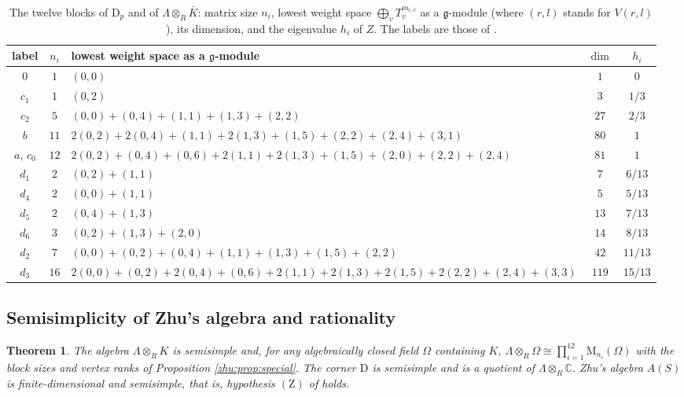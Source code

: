 \documentclass[leqno]{article}
\newcommand{\Cbb}{\ensuremath{\mathbb{C}}}
\newcommand{\D}{\mathrm{D}}
\newcommand{\M}{\mathrm{M}}
\newcommand{\ot}{\otimes}
\newcommand{\ovl}{\overline}
\newtheorem{thm}{Theorem}[section]
\numberwithin{equation}{section}
\begin{document}
\begin{table}[ht]
\centering
\footnotesize
\begin{tabular}{|c|c|p{8.2cm}|c|c|}
\hline
label & $n_i$ & lowest weight space as a $\mathfrak g$-module & $\dim$ & $h_i$\\
\hline
$0$ & $1$ & $(0,0)$ & $1$ & $0$\\
$c_1$ & $1$ & $(0,2)$ & $3$ & $1/3$\\
$c_2$ & $5$ & $(0,0)+(0,4)+(1,1)+(1,3)+(2,2)$ & $27$ & $2/3$\\
$b$ & $11$ & $2(0,2)+2(0,4)+(1,1)+2(1,3)+(1,5)+(2,2)+(2,4)+(3,1)$ & $80$ & $1$\\
$a$, $c_0$ & $12$ & $2(0,2)+(0,4)+(0,6)+2(1,1)+2(1,3)+(1,5)+(2,0)+(2,2)+(2,4)$ & $81$ & $1$\\
$d_1$ & $2$ & $(0,2)+(1,1)$ & $7$ & $6/13$\\
$d_4$ & $2$ & $(0,0)+(1,1)$ & $5$ & $5/13$\\
$d_5$ & $2$ & $(0,4)+(1,3)$ & $13$ & $7/13$\\
$d_6$ & $3$ & $(0,2)+(1,3)+(2,0)$ & $14$ & $8/13$\\
$d_2$ & $7$ & $(0,0)+(0,2)+(0,4)+(1,1)+(1,3)+(1,5)+(2,2)$ & $42$ & $11/13$\\
$d_3$ & $16$ & $2(0,0)+(0,2)+2(0,4)+(0,6)+2(1,1)+2(1,3)+2(1,5)+2(2,2)+(2,4)+(3,3)$ & $119$ & $15/13$\\
\hline
\end{tabular}
\caption{The twelve blocks of $\D_p$ and of $\Lambda \ot_R \ovl K$: matrix size $n_i$, lowest weight space $\bigoplus_v T_v^{m_{i,v}}$ as a $\mathfrak g$-module (where $(r,l)$ stands for $V(r,l)$), its dimension, and the eigenvalue $h_i$ of $Z$. The labels are those of \cite[Table 2]{Arh26}.}
\label{zhu:table:blocks}
\end{table}

\subsection{Semisimplicity of Zhu's algebra and rationality}
\label{zhu:sec:rationality}

\begin{thm}
\label{zhu:thm:Z}
The algebra $\Lambda \ot_R K$ is semisimple and, for any algebraically closed field $\Omega$ containing $K$, $\Lambda \ot_R \Omega \cong \prod_{i=1}^{12} \M_{n_i}(\Omega)$ with the block sizes and vertex ranks of Proposition \ref{zhu:prop:special}. The corner $\D$ is semisimple and is a quotient of $\Lambda \ot_R \Cbb$. Zhu's algebra $A(S)$ is finite-dimensional and semisimple, that is, hypothesis $\mathrm{(Z)}$ of \cite[Theorem 11.1]{Arh26} holds.
\end{thm}
\end{document}

